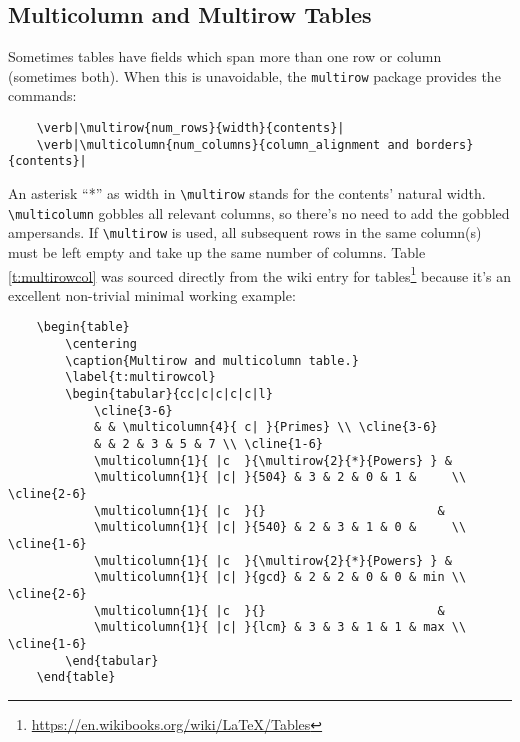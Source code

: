\subsection{Multicolumn and Multirow Tables}
%
Sometimes tables have fields which span more than one row or column (sometimes both). When this is unavoidable, the \verb|multirow| package provides the commands:
\begin{verbatim}
	\verb|\multirow{num_rows}{width}{contents}|
	\verb|\multicolumn{num_columns}{column_alignment and borders}{contents}|
\end{verbatim}
An asterisk ``*'' as width in \verb|\multirow| stands for the contents' natural width. \verb|\multicolumn| gobbles all relevant columns, so there's no need to add the gobbled ampersands. If \verb|\multirow| is used, all subsequent rows in the same column(s) must be left empty and take up the same number of columns. Table \ref{t:multirowcol} was sourced directly from the wiki entry for tables\footnote{\url{https://en.wikibooks.org/wiki/LaTeX/Tables}} because it's an excellent non-trivial minimal working example:
\begin{verbatim}
	\begin{table}
	    \centering
	    \caption{Multirow and multicolumn table.}
	    \label{t:multirowcol}
	    \begin{tabular}{cc|c|c|c|c|l}
	        \cline{3-6}
	        & & \multicolumn{4}{ c| }{Primes} \\ \cline{3-6}
	        & & 2 & 3 & 5 & 7 \\ \cline{1-6}
	        \multicolumn{1}{ |c  }{\multirow{2}{*}{Powers} } &
	        \multicolumn{1}{ |c| }{504} & 3 & 2 & 0 & 1 &     \\ \cline{2-6}
	        \multicolumn{1}{ |c  }{}                        &
	        \multicolumn{1}{ |c| }{540} & 2 & 3 & 1 & 0 &     \\ \cline{1-6}
	        \multicolumn{1}{ |c  }{\multirow{2}{*}{Powers} } &
	        \multicolumn{1}{ |c| }{gcd} & 2 & 2 & 0 & 0 & min \\ \cline{2-6}
	        \multicolumn{1}{ |c  }{}                        &
	        \multicolumn{1}{ |c| }{lcm} & 3 & 3 & 1 & 1 & max \\ \cline{1-6}
	    \end{tabular}
	\end{table}
\end{verbatim}

